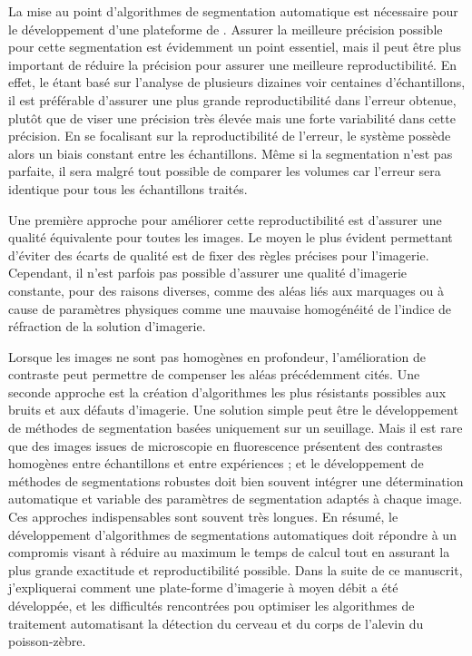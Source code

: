 \documentclass[\main/main.tex]{subfiles}
\begin{document}
%
La mise au point d'algorithmes de segmentation automatique est nécessaire pour le développement d'une plateforme de \hcs{}.
%
Assurer la meilleure précision possible pour cette segmentation est évidemment un point essentiel, mais il peut être plus important de réduire la précision pour assurer une meilleure reproductibilité.
%
En effet, le \hcs{} étant basé sur l'analyse de plusieurs dizaines voir centaines d'échantillons,
il est préférable d'assurer une plus grande reproductibilité dans l'erreur obtenue, plutôt que de viser une précision très élevée mais une forte variabilité dans cette précision.
%
En se focalisant sur la reproductibilité de l'erreur, le système possède alors un biais constant entre les échantillons. Même si la segmentation n'est pas parfaite, il sera malgré tout possible de comparer les volumes car l'erreur sera identique pour tous les échantillons traités.

%
Une première approche pour améliorer cette reproductibilité est d'assurer une qualité équivalente pour toutes les images.
%
Le moyen le plus évident permettant d'éviter des écarts de qualité est de fixer des règles précises pour l'imagerie.
%
Cependant, il n'est parfois pas possible d'assurer une qualité d'imagerie constante, pour des raisons diverses, comme des aléas liés aux marquages \ihc{} ou à cause de paramètres physiques comme une mauvaise homogénéité de l'indice de réfraction de la solution d'imagerie.

Lorsque les images ne sont pas homogènes en profondeur, l'amélioration de contraste peut permettre de compenser les aléas précédemment cités.
%
Une seconde approche est la création d'algorithmes les plus résistants possibles aux bruits et aux défauts d'imagerie.
Une solution simple peut être le développement de méthodes de segmentation basées uniquement sur un seuillage.
%
 Mais il est rare que des images issues de microscopie en fluorescence présentent des contrastes homogènes entre échantillons et entre expériences ; et le développement de méthodes de segmentations robustes doit bien souvent intégrer une détermination automatique et variable des paramètres de segmentation adaptés à chaque image. Ces approches indispensables sont souvent très longues.
 En résumé, le développement d'algorithmes de segmentations automatiques doit répondre à un compromis  visant à réduire au maximum le temps de calcul tout en assurant la plus grande exactitude et reproductibilité possible.
%
Dans la suite de ce manuscrit, j'expliquerai comment une plate-forme d'imagerie à moyen débit a été développée, et les difficultés rencontrées pou optimiser les algorithmes de traitement automatisant la détection du cerveau et du corps de l'alevin du poisson-zèbre.
\end{document}
